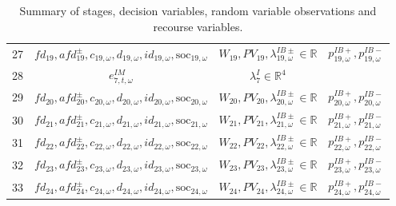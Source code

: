 \documentclass{article}
\newcommand{\R}{\mathbb{R}}
\newcommand{\soc}{\text{soc}}
\begin{document}
\begin{table}
\begin{tabular}{c c c c}
	27 & $fd_{19}, afd^{\pm}_{19}, c_{19, \omega}, d_{19, \omega}, id_{19, \omega}, \soc_{19, \omega}$ & $W_{19}, PV_{19}, \lambda^{IB\pm}_{19, \omega} \in \R$ & $p^{IB+}_{19, \omega}, p^{IB-}_{19, \omega}$ \\
	28 & $e^{IM}_{7, t, \omega}$ & $\lambda^I_7 \in \R^{4}$ &   \\
	29 & $fd_{20}, afd^{\pm}_{20}, c_{20, \omega}, d_{20, \omega}, id_{20, \omega}, \soc_{20, \omega}$  & $W_{20}, PV_{20}, \lambda^{IB\pm}_{20, \omega} \in \R$ & $p^{IB+}_{20, \omega}, p^{IB-}_{20, \omega}$ \\
	30 &  $fd_{21}, afd^{\pm}_{21}, c_{21, \omega}, d_{21, \omega}, id_{21, \omega}, \soc_{21, \omega}$ & $W_{21}, PV_{21}, \lambda^{IB\pm}_{21, \omega} \in \R$ & $p^{IB+}_{21, \omega}, p^{IB-}_{21, \omega}$ \\
	31 & $fd_{22}, afd^{\pm}_{22}, c_{22, \omega}, d_{22, \omega}, id_{22, \omega}, \soc_{22, \omega}$ & $W_{22}, PV_{22}, \lambda^{IB\pm}_{22, \omega} \in \R$ & $p^{IB+}_{22, \omega}, p^{IB-}_{22, \omega}$ \\
	32 & $fd_{23}, afd^{\pm}_{23}, c_{23, \omega}, d_{23, \omega}, id_{23, \omega}, \soc_{23, \omega}$ & $W_{23}, PV_{23}, \lambda^{IB\pm}_{23, \omega} \in \R$ & $p^{IB+}_{23, \omega}, p^{IB-}_{23, \omega}$ \\
	33 & $fd_{24}, afd^{\pm}_{24}, c_{24, \omega}, d_{24, \omega}, id_{24, \omega}, \soc_{24, \omega}$ & $W_{24}, PV_{24}, \lambda^{IB\pm}_{24, \omega} \in \R$ & $p^{IB+}_{24, \omega}, p^{IB-}_{24, \omega}$ \\
		
	
\end{tabular}
\caption{Summary of stages, decision variables, random variable observations and recourse variables.}
\label{TABLE:stages-rv-dv}
\end{table}



\printbibliography
\end{document}
